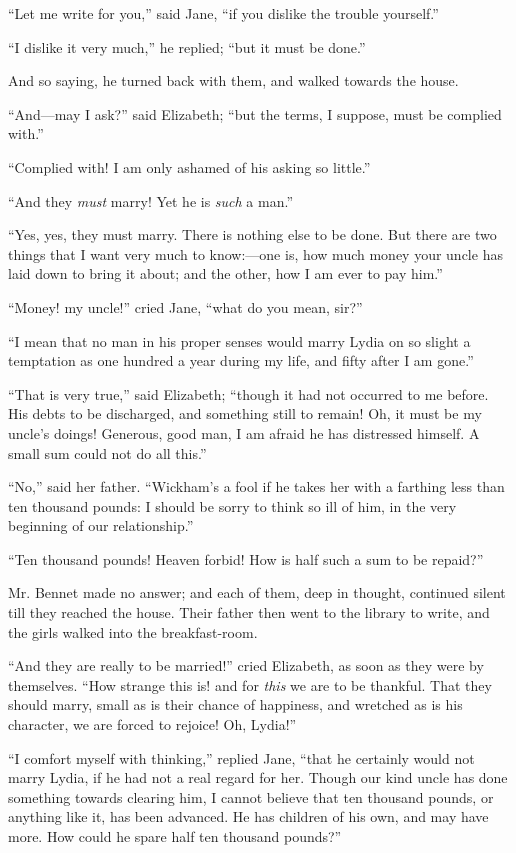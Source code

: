 \documentclass[12pt,openright]{book}
\begin{document}
“Let me write for you,” said Jane, “if you dislike the trouble yourself.”

“I dislike it very much,” he replied; “but it must be done.”

And so saying, he turned back with them, and walked towards the house.

“And—may I ask?” said Elizabeth; “but the terms, I suppose, must be complied with.”

“Complied with! I am only ashamed of his asking so little.”

“And they \textit{must} marry! Yet he is \textit{such} a man.”

“Yes, yes, they must marry. There is nothing else to be done. But there are two things that I want very much to know:—one is, how much money your uncle has laid down to bring it about; and the other, how I am ever to pay him.”

“Money! my uncle!” cried Jane, “what do you mean, sir?”

“I mean that no man in his proper senses would marry Lydia on so slight a temptation as one hundred a year during my life, and fifty after I am gone.”

“That is very true,” said Elizabeth; “though it had not occurred to me before. His debts to be discharged, and something still to remain! Oh, it must be my uncle’s doings! Generous, good man, I am afraid he has distressed himself. A small sum could not do all this.”

“No,” said her father. “Wickham’s a fool if he takes her with a farthing less than ten thousand pounds: I should be sorry to think so ill of him, in the very beginning of our relationship.”

“Ten thousand pounds! Heaven forbid! How is half such a sum to be repaid?”

Mr. Bennet made no answer; and each of them, deep in thought, continued silent till they reached the house. Their father then went to the library to write, and the girls walked into the breakfast-room.

“And they are really to be married!” cried Elizabeth, as soon as they were by themselves. “How strange this is! and for \textit{this} we are to be thankful. That they should marry, small as is their chance of happiness, and wretched as is his character, we are forced to rejoice! Oh, Lydia!”

“I comfort myself with thinking,” replied Jane, “that he certainly would not marry Lydia, if he had not a real regard for her. Though our kind uncle has done something towards clearing him, I cannot believe that ten thousand pounds, or anything like it, has been advanced. He has children of his own, and may have more. How could he spare half ten thousand pounds?”
\end{document}

